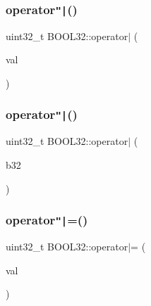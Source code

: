 \hypertarget{struct_b_o_o_l32_a5565718e0df53727e98dafdf0920dc8b}{}\label{struct_b_o_o_l32_a5565718e0df53727e98dafdf0920dc8b} 
\subsubsection{\texorpdfstring{operator\texttt{"|}()}{operator|()}\hspace{0.1cm}{\footnotesize\ttfamily [1/2]}}
{\footnotesize\ttfamily uint32\+\_\+t B\+O\+O\+L32\+::operator$\vert$ (\begin{DoxyParamCaption}\item[{const uint32\+\_\+t}]{val }\end{DoxyParamCaption})\hspace{0.3cm}{\ttfamily [inline]}}

\hypertarget{struct_b_o_o_l32_a12bc7b47d1fe18aea25b1f35393184db}{}\label{struct_b_o_o_l32_a12bc7b47d1fe18aea25b1f35393184db} 
\subsubsection{\texorpdfstring{operator\texttt{"|}()}{operator|()}\hspace{0.1cm}{\footnotesize\ttfamily [2/2]}}
{\footnotesize\ttfamily uint32\+\_\+t B\+O\+O\+L32\+::operator$\vert$ (\begin{DoxyParamCaption}\item[{const \hyperlink{struct_b_o_o_l32}{B\+O\+O\+L32}}]{b32 }\end{DoxyParamCaption})\hspace{0.3cm}{\ttfamily [inline]}}

\hypertarget{struct_b_o_o_l32_a26246376aea1ea939187c2ebbf223f16}{}\label{struct_b_o_o_l32_a26246376aea1ea939187c2ebbf223f16} 
\subsubsection{\texorpdfstring{operator\texttt{"|}=()}{operator|=()}\hspace{0.1cm}{\footnotesize\ttfamily [1/2]}}
{\footnotesize\ttfamily uint32\+\_\+t B\+O\+O\+L32\+::operator$\vert$= (\begin{DoxyParamCaption}\item[{const uint32\+\_\+t}]{val }\end{DoxyParamCaption})\hspace{0.3cm}{\ttfamily [inline]}}

